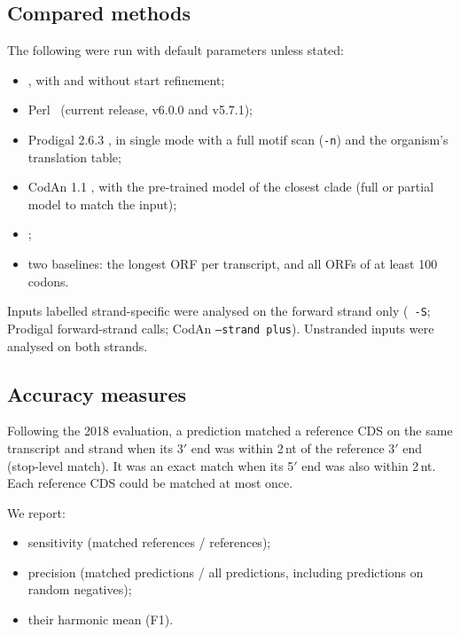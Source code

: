 \subsection{Compared methods}
The following were run with default parameters unless stated:
\begin{itemize}
  \item \PyTD, with and without start refinement;
  \item Perl \TD\ (current release, v6.0.0 and v5.7.1);
  \item Prodigal 2.6.3 \citep{Hyatt2010}, in single mode with a full motif scan (\texttt{-n}) and
        the organism's translation table;
  \item CodAn 1.1 \citep{Nachtigall2021}, with the pre-trained model of the closest clade (full or
        partial model to match the input);
  \item {};
  \item two baselines: the longest ORF per transcript, and all ORFs of at least 100 codons.
\end{itemize}
Inputs labelled strand-specific were analysed on the forward strand only (\TD\ \texttt{-S};
Prodigal forward-strand calls; CodAn \texttt{--strand plus}). Unstranded inputs were analysed on both
strands.

\subsection{Accuracy measures}
Following the 2018 evaluation, a prediction matched a reference CDS on the same transcript and strand
when its 3$'$ end was within 2\,nt of the reference 3$'$ end (stop-level match). It was an exact match
when its 5$'$ end was also within 2\,nt. Each reference CDS could be matched at most once.

We report:
\begin{itemize}
  \item sensitivity (matched references / references);
  \item precision (matched predictions / all predictions, including predictions on random
        negatives);
  \item their harmonic mean (F1).
\end{itemize}

